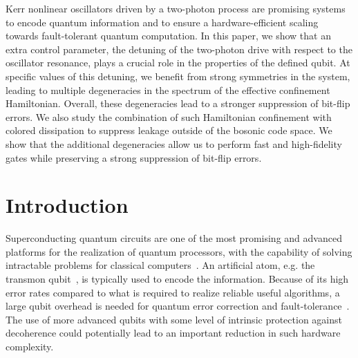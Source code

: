 





Kerr nonlinear oscillators driven by a two-photon process are promising systems to encode quantum information and to ensure a hardware-efficient scaling towards fault-tolerant quantum computation. In this paper, we show that an extra control parameter, the detuning of the two-photon drive with respect to the oscillator resonance, plays a crucial role in the properties of the defined qubit. At specific values of this detuning, we benefit from strong symmetries in the system, leading to multiple degeneracies in the spectrum of the effective confinement Hamiltonian. Overall, these degeneracies lead to a stronger suppression of bit-flip errors. We also study the combination of such Hamiltonian confinement with colored dissipation to suppress leakage outside of the bosonic code space. We show that the additional degeneracies allow us to perform fast and high-fidelity gates while preserving a strong suppression of bit-flip errors.


\maketitle


\section{\label{sec:level1}Introduction}

Superconducting quantum circuits are one of the most promising and advanced platforms for the realization of quantum processors, with the capability of solving intractable problems for classical computers~\cite{Google_Supremacy}. An artificial atom, e.g. the transmon qubit~\cite{Koch2007}, is typically used to encode the information. Because of its high error rates compared to what is required to realize reliable useful algorithms, a large qubit overhead is needed for quantum error correction and fault-tolerance~\cite{Shor1996,Fowler2012}. The use of more advanced  qubits with some level of intrinsic protection against decoherence could potentially lead to an important reduction in such hardware complexity.

